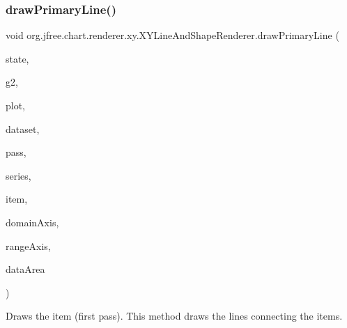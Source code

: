 \subsubsection{\texorpdfstring{draw\+Primary\+Line()}{drawPrimaryLine()}}
{\footnotesize\ttfamily void org.\+jfree.\+chart.\+renderer.\+xy.\+X\+Y\+Line\+And\+Shape\+Renderer.\+draw\+Primary\+Line (\begin{DoxyParamCaption}\item[{\mbox{\hyperlink{classorg_1_1jfree_1_1chart_1_1renderer_1_1xy_1_1_x_y_item_renderer_state}{X\+Y\+Item\+Renderer\+State}}}]{state,  }\item[{Graphics2D}]{g2,  }\item[{\mbox{\hyperlink{classorg_1_1jfree_1_1chart_1_1plot_1_1_x_y_plot}{X\+Y\+Plot}}}]{plot,  }\item[{\mbox{\hyperlink{interfaceorg_1_1jfree_1_1data_1_1xy_1_1_x_y_dataset}{X\+Y\+Dataset}}}]{dataset,  }\item[{int}]{pass,  }\item[{int}]{series,  }\item[{int}]{item,  }\item[{\mbox{\hyperlink{classorg_1_1jfree_1_1chart_1_1axis_1_1_value_axis}{Value\+Axis}}}]{domain\+Axis,  }\item[{\mbox{\hyperlink{classorg_1_1jfree_1_1chart_1_1axis_1_1_value_axis}{Value\+Axis}}}]{range\+Axis,  }\item[{Rectangle2D}]{data\+Area }\end{DoxyParamCaption})\hspace{0.3cm}{\ttfamily [protected]}}

Draws the item (first pass). This method draws the lines connecting the items.


